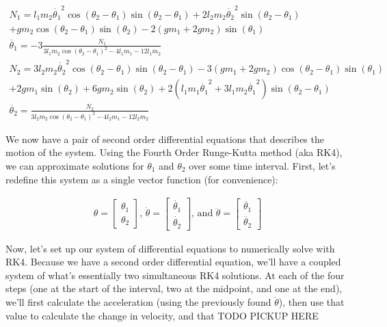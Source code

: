 \documentclass[]{article}
\begin{document}
\begin{gather*}
	N_1 = l_1 m_2 {\dot{\theta_1}}^{2} \cos({\theta_2} - {\theta_1}) \sin({\theta_2} - {\theta_1}) + 2  l_2 m_2 {\dot{\theta_2}}^{2} \sin({\theta_2} - {\theta_1}) \\ + g m_2 \cos({\theta_2} - {\theta_1}) \sin({\theta_2}) - 2  {(g m_1 + 2  g m_2)} \sin({\theta_1}) \\
	\ddot{\theta_1} = -3\frac{N_1}{3  l_1 m_2 \cos({\theta_2} - {\theta_1})^{2} - 4  l_1 m_1 - 12  l_1 m_2} \\
	N_2 = 3  l_2 m_2 {\dot{\theta_2}}^{2} \cos({\theta_2} - {\theta_1}) \sin({\theta_2} - {\theta_1}) - 3  {(g m_1 + 2  g m_2)} \cos({\theta_2} - {\theta_1}) \sin({\theta_1}) \\ + 2  g m_1 \sin({\theta_2}) + 6  g m_2 \sin({\theta_2}) + 2  {(l_1 m_1 {\dot{\theta_1}}^{2} + 3  l_1 m_2 {\dot{\theta_1}}^{2})} \sin({\theta_2} - {\theta_1}) \\
	\ddot{\theta_2} = \frac{N_2}{3  l_2 m_2 \cos({\theta_2} - {\theta_1})^{2} - 4  l_2 m_1 - 12  l_2 m_2}
\end{gather*}

We now have a pair of second order differential equations that describes the motion of the system. Using the Fourth Order Runge-Kutta method (aka RK4), we can approximate solutions for $\theta_1$ and $\theta_2$ over some time interval. First, let's redefine this system as a single vector function (for convenience):

\begin{gather*}
	\theta = 
	\begin{bmatrix}
		\theta_1 \\
		\theta_2
	\end{bmatrix} \text{, }
	\dot{\theta} = 
	\begin{bmatrix}
		\dot{\theta_1} \\
		\dot{\theta_2}
	\end{bmatrix} \text{, and }
	\ddot{\theta} =
	\begin{bmatrix}
		\ddot{\theta_1} \\
		\ddot{\theta_2}
	\end{bmatrix}
\end{gather*}

Now, let's set up our system of differential equations to numerically solve with RK4. Because we have a second order differential equation, we'll have a coupled system of what's essentially two simultaneous RK4 solutions. At each of the four steps (one at the start of the interval, two at the midpoint, and one at the end), we'll first calculate the acceleration (using the previously found $\ddot{\theta}$), then use that value to calculate the change in velocity, and that TODO PICKUP HERE
\end{document}
